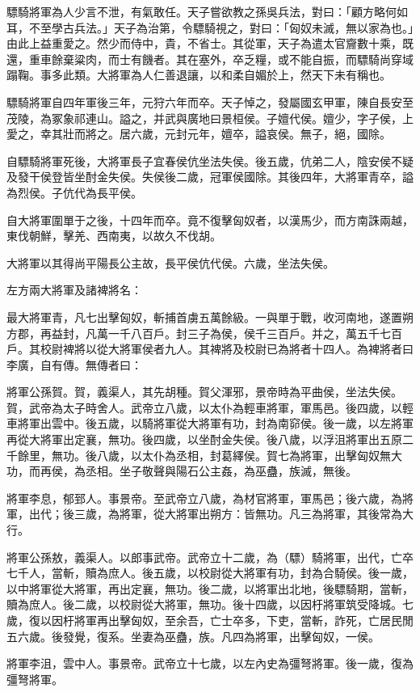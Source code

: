 \begin{pinyinscope}
驃騎將軍為人少言不泄，有氣敢任。天子嘗欲教之孫吳兵法，對曰：「顧方略何如耳，不至學古兵法。」天子為治第，令驃騎視之，對曰：「匈奴未滅，無以家為也。」由此上益重愛之。然少而侍中，貴，不省士。其從軍，天子為遣太官齎數十乘，既還，重車餘棄粱肉，而士有饑者。其在塞外，卒乏糧，或不能自振，而驃騎尚穿域蹋鞠。事多此類。大將軍為人仁善退讓，以和柔自媚於上，然天下未有稱也。

驃騎將軍自四年軍後三年，元狩六年而卒。天子悼之，發屬國玄甲軍，陳自長安至茂陵，為冢象祁連山。謚之，并武與廣地曰景桓侯。子嬗代侯。嬗少，字子侯，上愛之，幸其壯而將之。居六歲，元封元年，嬗卒，謚哀侯。無子，絕，國除。

自驃騎將軍死後，大將軍長子宜春侯伉坐法失侯。後五歲，伉弟二人，陰安侯不疑及發干侯登皆坐酎金失侯。失侯後二歲，冠軍侯國除。其後四年，大將軍青卒，謚為烈侯。子伉代為長平侯。

自大將軍圍單于之後，十四年而卒。竟不復擊匈奴者，以漢馬少，而方南誅兩越，東伐朝鮮，擊羌、西南夷，以故久不伐胡。

大將軍以其得尚平陽長公主故，長平侯伉代侯。六歲，坐法失侯。

左方兩大將軍及諸裨將名：

最大將軍青，凡七出擊匈奴，斬捕首虜五萬餘級。一與單于戰，收河南地，遂置朔方郡，再益封，凡萬一千八百戶。封三子為侯，侯千三百戶。并之，萬五千七百戶。其校尉裨將以從大將軍侯者九人。其裨將及校尉已為將者十四人。為裨將者曰李廣，自有傳。無傳者曰：

將軍公孫賀。賀，義渠人，其先胡種。賀父渾邪，景帝時為平曲侯，坐法失侯。賀，武帝為太子時舍人。武帝立八歲，以太仆為輕車將軍，軍馬邑。後四歲，以輕車將軍出雲中。後五歲，以騎將軍從大將軍有功，封為南窌侯。後一歲，以左將軍再從大將軍出定襄，無功。後四歲，以坐酎金失侯。後八歲，以浮沮將軍出五原二千餘里，無功。後八歲，以太仆為丞相，封葛繹侯。賀七為將軍，出擊匈奴無大功，而再侯，為丞相。坐子敬聲與陽石公主姦，為巫蠱，族滅，無後。

將軍李息，郁郅人。事景帝。至武帝立八歲，為材官將軍，軍馬邑；後六歲，為將軍，出代；後三歲，為將軍，從大將軍出朔方：皆無功。凡三為將軍，其後常為大行。

將軍公孫敖，義渠人。以郎事武帝。武帝立十二歲，為（驃）騎將軍，出代，亡卒七千人，當斬，贖為庶人。後五歲，以校尉從大將軍有功，封為合騎侯。後一歲，以中將軍從大將軍，再出定襄，無功。後二歲，以將軍出北地，後驃騎期，當斬，贖為庶人。後二歲，以校尉從大將軍，無功。後十四歲，以因杅將軍筑受降城。七歲，復以因杅將軍再出擊匈奴，至余吾，亡士卒多，下吏，當斬，詐死，亡居民閒五六歲。後發覺，復系。坐妻為巫蠱，族。凡四為將軍，出擊匈奴，一侯。

將軍李沮，雲中人。事景帝。武帝立十七歲，以左內史為彊弩將軍。後一歲，復為彊弩將軍。


\end{pinyinscope}

